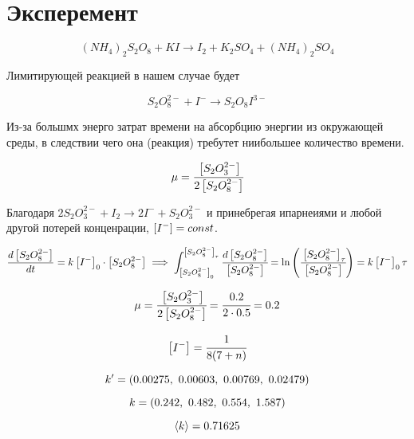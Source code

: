 \section{Эксперемент}

\begin{equation} 
    (NH_4)_2S_2O_8 + KI \xrightarrow{} 
    I_2 + K_2SO_4 + (NH_4)_2SO_4 
\end{equation} 

Лимитирующей реакцией в нашем случае будет 

\begin{equation} 
  S_2O_8^{2 -} + I^{ -} \xrightarrow{} S_2O_8I^{3 -} 
\end{equation} 

Из-за большмх энерго затрат времени на абсорбцию энергии
из окружающей среды, в следствии чего она (реакция)
требутет ниибольшее количество времени.

\begin{equation} 
 \mu = \cfrac{\left[ S_2O_3^{2 -} \right]}{2\left[ S_2O_8^{2 -} \right]} 
\end{equation} 

Благодаря $2S_2O_3^{2-} + I_2 \xrightarrow{} 2I^{-} + S_2O_3^{2-}$ 
и принебрегая ипарнеиями и любой другой потерей конценрации, 
$\left[ I^{ -} \right] = const$. 

\begin{equation} 
  \frac{d \left[ S_2O_8^{2 -} \right]}{d t} = k \left[ I^{ -} \right]_0 \cdot 
  \left[ S_2O_8^{2 - } \right] \implies 
  \int_{\left[ S_2O_8^{2 -} \right]_0}^{\left[ S_2O_8^{2 -} \right]_\tau} 
  \cfrac{d\left[ S_2O_8^{2 -} \right]}{\left[ S_2O_8^{2 -} \right]} =
  \ln \left( \cfrac{\left[ S_2O_8^{2 -} \right]_\tau}{\left[ S_2O_8^{2 -} \right]} \right)
  = k \left[ I^{ -} \right]_0 \tau 
\end{equation} 

\begin{equation} 
 \mu = \cfrac{\left[ S_2O_3^{2 -} \right]}{2\left[ S_2O_8^{2 -} \right]} = 
 \cfrac{0.2}{2\cdot 0.5} = 0.2
\end{equation} 

\begin{equation} 
 \left[ I^ -  \right] =  \cfrac{1}{8(7 + n)}
\end{equation} 

\begin{equation} 
 k' = \inner{0.00275, \ 0.00603, \ 0.00769, \ 0.02479}
\end{equation} 

\begin{equation} 
  k = \inner{0.242, \ 0.482, \ 0.554, \ 1.587}
\end{equation} 

\begin{equation} 
 \left\langle k \right\rangle = 0.71625 
\end{equation} 


